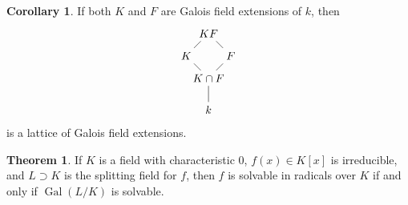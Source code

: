 \documentclass[10pt,letterpaper,cm]{nupset}
\theoremstyle{definition}
\newtheorem{theorem}{Theorem}
\newtheorem{corollary}{Corollary}
\newcommand{\1}{\mathbf{1}}
\newcommand{\0}{\vec 0}
\DeclareMathOperator{\gal}{Gal}
\begin{document}
\begin{corollary}
If both $K$ and $F$ are Galois field extensions of $k$, then
\[
\begin{tikzpicture}
\node (top) at (0,0) {$KF$};	
\node  [below left of=top] (l) {$K$};
\node [below right of=top] (r)  {$F$};
\node  [below right of=l] (c) {$K\cap F$};
\node [below of=c] (c')  {$k$};

\draw (top) -- (l);
\draw (top) -- (r);
\draw (l) -- (c);
\draw (r) -- (c);
\draw (c) -- (c');
\end{tikzpicture}
\]
is a lattice of Galois field extensions.
\end{corollary}

\begin{theorem}
If $K$ is a field with characteristic $0$, $f(x) \in K[x]$ is irreducible, and $L \supset K$ is the splitting field for $f$, then  $f$ is solvable in radicals over $K$ if and only if $\gal(L/K)$ is solvable. 
\end{theorem}
\end{document}

